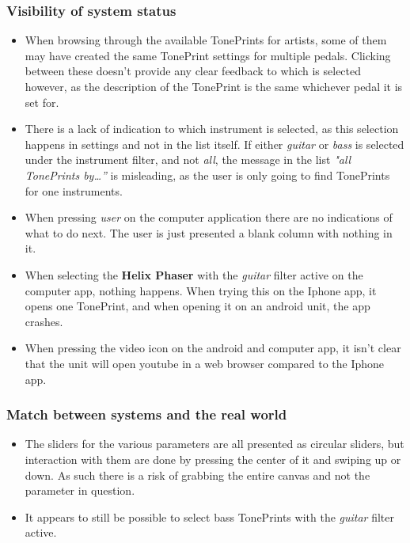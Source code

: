 \subsubsection{Visibility of system status}
\begin{itemize}
	\item When browsing through the available TonePrints for artists, some of them may have created the same TonePrint settings for multiple pedals. Clicking between these doesn’t provide any clear feedback to which is selected however, as the description of the TonePrint is the same whichever pedal it is set for.\\
	\item There is a lack of indication to which instrument is selected, as this selection happens in settings and not in the list itself. If either \textit{guitar} or \textit{bass} is selected under the instrument filter, and not \textit{all}, the message in the list \textit{"all TonePrints by…”} is misleading, as the user is only going to find TonePrints for one instruments.\\
	\item When pressing \textit{user} on the computer application there are no indications of what to do next. The user is just presented a blank column with nothing in it.\\
	\item When selecting the \textbf{Helix Phaser} with the \textit{guitar} filter active on the computer app, nothing happens. When trying this on the Iphone app, it opens one TonePrint, and when opening it on an android unit, the app crashes.\\
	\item When pressing the video icon on the android and computer app, it isn't clear that the unit will open youtube in a web browser compared to the Iphone app.
\end{itemize}
%
\subsubsection{Match between systems and the real world}
\begin{itemize}
	\item The sliders for the various parameters are all presented as circular sliders, but interaction with them are done by pressing the center of it and swiping up or down. As such there is a risk of grabbing the entire canvas and not the parameter in question.\\
	\item It appears to still be possible to select bass TonePrints with the \textit{guitar} filter active.
\end{itemize}
%
